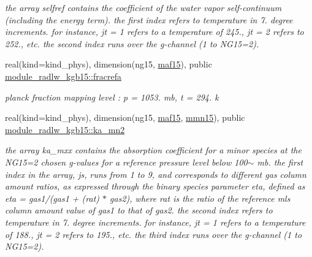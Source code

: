 \begin{DoxyCompactItemize}
\begin{DoxyCompactList}\small\item\em the array selfref contains the coefficient of the water vapor self-\/continuum (including the energy term). the first index refers to temperature in 7. degree increments. for instance, jt = 1 refers to a temperature of 245., jt = 2 refers to 252., etc. the second index runs over the g-\/channel (1 to N\+G15=2). \end{DoxyCompactList}\item 
\mbox{\label{group__module__radlw__kgbnn_ga4b5c5f6fd9ea806843adf78ec1b43cd2}} 
real(kind=kind\+\_\+phys), dimension(ng15, \hyperlink{group__module__radlw__kgbnn_ga482858cf08fb1a14117dfbaa6a57fe8c}{maf15}), public \hyperlink{group__module__radlw__kgbnn_ga4b5c5f6fd9ea806843adf78ec1b43cd2}{module\+\_\+radlw\+\_\+kgb15\+::fracrefa}
\begin{DoxyCompactList}\small\item\em planck fraction mapping level \+: p = 1053. mb, t = 294. k \end{DoxyCompactList}\item 
\mbox{\label{group__module__radlw__kgbnn_gaff32d89fe8fef50ff79136cc7aa50526}} 
real(kind=kind\+\_\+phys), dimension(ng15, \hyperlink{group__module__radlw__kgbnn_ga482858cf08fb1a14117dfbaa6a57fe8c}{maf15}, \hyperlink{group__module__radlw__kgbnn_ga8ab45999cfc7b9db0f3d3b61ccf803e8}{mmn15}), public \hyperlink{group__module__radlw__kgbnn_gaff32d89fe8fef50ff79136cc7aa50526}{module\+\_\+radlw\+\_\+kgb15\+::ka\+\_\+mn2}
\begin{DoxyCompactList}\small\item\em the array ka\+\_\+mxx contains the absorption coefficient for a minor species at the N\+G15=2 chosen g-\/values for a reference pressure level below 100$\sim$ mb. the first index in the array, js, runs from 1 to 9, and corresponds to different gas column amount ratios, as expressed through the binary species parameter eta, defined as eta = gas1/(gas1 + (rat) $\ast$ gas2), where rat is the ratio of the reference mls column amount value of gas1 to that of gas2. the second index refers to temperature in 7. degree increments. for instance, jt = 1 refers to a temperature of 188., jt = 2 refers to 195., etc. the third index runs over the g-\/channel (1 to N\+G15=2). \end{DoxyCompactList}\item 

\end{DoxyCompactItemize}
